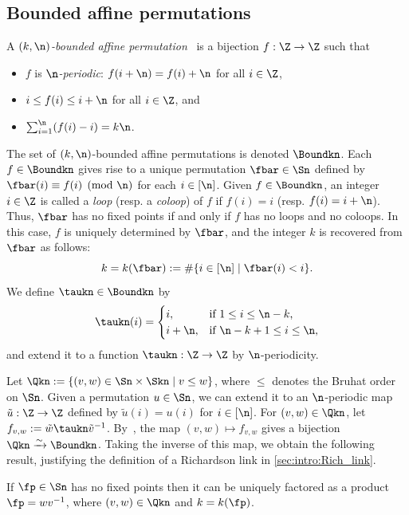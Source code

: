 \subsection{Bounded affine permutations}\label{sec:bound-affine-perm}
A \emph{$(k,\n)$-bounded affine permutation}~\cite{KLS} is a bijection $f:\Z\to\Z$ such that 
\begin{itemize}
\item $f$ is \emph{$\n$-periodic}: $f(i+\n)=f(i)+\n$ for all $i\in \Z$,
\item  $i\leq f(i)\leq i+\n$ for all $i\in\Z$, and %
\item $\sum_{i=1}^\n(f(i)-i)=k\n$.
\end{itemize}
The set of $(k,\n)$-bounded affine permutations is denoted $\Boundkn$. Each $f\in\Boundkn$ gives rise to a unique permutation $\fbar\in\Sn$ defined by $\fbar(i)\equiv f(i)\pmod \n$ for each $i\in[\n]$. Given $f\in\Boundkn$, an integer $i\in\Z$ is called a \emph{loop} (resp. a \emph{coloop}) of $f$ if $f(i)=i$ (resp. $f(i)=i+\n$). Thus, $\fbar$ has no fixed points if and only if $f$ has no loops and no coloops. In this case, $f$ is uniquely determined by $\fbar$, and the integer $k$ is recovered from $\fbar$ as follows:
\begin{equation*}%
  k=k(\fbar):=\#\{i\in[\n]\mid \fbar(i)<i\}.
\end{equation*}
We define $\taukn\in\Boundkn$  by
\begin{equation*}%
  \taukn(i)=
  \begin{cases}
    i, &\text{if $1\leq i\leq \n-k$,}\\
    i+\n, &\text{if $\n-k+1\leq i\leq \n$,}
  \end{cases}
\end{equation*}
and extend it to a function $\taukn:\Z\to\Z$ by $\n$-periodicity. 


Let $\Qkn:=\{(v,w)\in \Sn\times \Skn\mid v\leq w\}$, where $\leq$ denotes the Bruhat order on $\Sn$. Given a permutation $u\in\Sn$, we can extend it to an $\n$-periodic map $\tilde u:\Z\to\Z$ defined by $\tilde u(i)=u(i)$ for $i\in[\n]$. For $(v,w)\in\Qkn$, let $f_{v,w}:=\tilde w\taukn\tilde v^{-1}$. By~\cite[Proposition~3.15]{KLS}, the map $(v,w)\mapsto f_{v,w}$ gives a bijection $\Qkn\xrightarrow{\sim} \Boundkn$. Taking the inverse of this map, we obtain the following result, justifying the definition of a Richardson link in \cref{sec:intro:Rich_link}.
\begin{corollary}\label{cor:KLS}
If $\fp\in\Sn$ has no fixed points then it can be uniquely factored as a product $\fp=wv^{-1}$, where $(v,w)\in\Qkn$ and $k=k(\fp)$.
\end{corollary}

